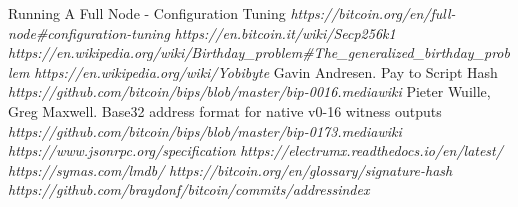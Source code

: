 \documentclass{report}
\begin{document}
\begin{thebibliography}{2}
	 Running A Full Node - Configuration Tuning \textit{https://bitcoin.org/en/full-node\#configuration-tuning}
	 \textit{https://en.bitcoin.it/wiki/Secp256k1}
	 \textit{https://en.wikipedia.org/wiki/Birthday\_problem\#The\_generalized\_birthday\_problem}
	 \textit{https://en.wikipedia.org/wiki/Yobibyte}
	 Gavin Andresen. Pay to Script Hash \textit{https://github.com/bitcoin/bips/blob/master/bip-0016.mediawiki}
	 Pieter Wuille, Greg Maxwell. Base32 address format for native v0-16 witness outputs \textit{https://github.com/bitcoin/bips/blob/master/bip-0173.mediawiki}
	 \textit{https://www.jsonrpc.org/specification}
	 \textit{https://electrumx.readthedocs.io/en/latest/}
	 \textit{https://symas.com/lmdb/}
	 \textit{https://bitcoin.org/en/glossary/signature-hash}
	 \textit{https://github.com/braydonf/bitcoin/commits/addressindex}
\end{thebibliography}
\end{document}

